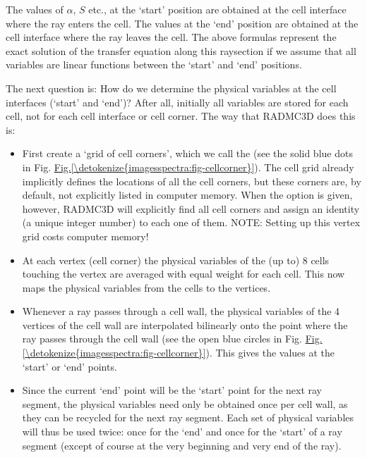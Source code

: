 \documentclass[letterpaper,10pt,english]{sphinxmanual}
\begin{document}
The values of \(\alpha\), \(S\) etc., at the ‘start’ position are
obtained at the cell interface where the ray enters the cell. The values at the
‘end’ position are obtained at the cell interface where the ray leaves the cell.
The above formulas represent the exact solution of the transfer equation along
this ray\sphinxhyphen{}section if we assume that all variables are linear functions between
the ‘start’ and ‘end’ positions.

The next question is: How do we determine the physical variables at the
cell interfaces (‘start’ and ‘end’)? After all, initially all variables
are stored for each cell, not for each cell interface or cell corner. The
way that RADMC\sphinxhyphen{}3D does this is:
\begin{itemize}
\item {} 
First create a ‘grid of cell corners’, which we call the  (see the solid blue dots in
Fig. \hyperref[\detokenize{imagesspectra:fig-cellcorner}]{Fig.\@ \ref{\detokenize{imagesspectra:fig-cellcorner}}}). The cell grid already
implicitly defines the locations of all the cell corners, but these
corners are, by default, not explicitly listed in computer memory. When
the  option is given, however, RADMC\sphinxhyphen{}3D will
explicitly find all cell corners and assign an identity (a unique integer
number) to each one of them. NOTE: Setting up this vertex grid costs
computer memory!

\item {} 
At each vertex (cell corner) the physical variables of the (up to) 8
cells touching the vertex are averaged with equal weight for each cell.
This now maps the physical variables from the cells to the vertices.

\item {} 
Whenever a ray passes through a cell wall, the physical variables of
the 4 vertices of the cell wall are interpolated bilinearly onto the point
where the ray passes through the cell wall (see the open blue circles in
Fig. \hyperref[\detokenize{imagesspectra:fig-cellcorner}]{Fig.\@ \ref{\detokenize{imagesspectra:fig-cellcorner}}}). This gives the values at the
‘start’ or ‘end’ points.

\item {} 
Since the current ‘end’ point will be the ‘start’ point for the
next ray segment, the physical variables need only be obtained once per
cell wall, as they can be recycled for the next ray segment. Each set of
physical variables will thus be used twice: once for the ‘end’ and once
for the ‘start’ of a ray segment (except of course at the very beginning
and very end of the ray).

\end{itemize}
\end{document}
